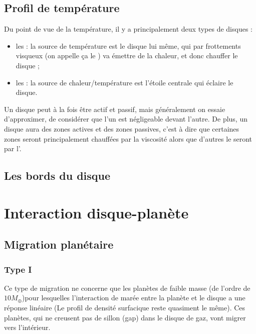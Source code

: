 \subsection{Profil de température}
Du point de vue de la température, il y a principalement deux types de disques : 
\begin{itemize}
\item les  : la source de température est le disque lui même, qui par frottements visqueux (on appelle ça le ) va émettre de la chaleur, et donc chauffer le disque ;
\item les  : la source de chaleur/température est l'étoile centrale qui éclaire le disque. 
\end{itemize}

Un disque peut à la fois être actif et passif, mais généralement on essaie d'approximer, de considérer que l'un est négligeable devant l'autre. De plus, un disque aura des zones actives et des zones passives, c'est à dire que certaines zones seront principalement chauffées par la viscosité alors que d'autres le seront par l'.

\subsection{Les bords du disque}

\section{Interaction disque-planète}
\subsection{Migration planétaire}
\subsubsection{Type I}
Ce type de migration ne concerne que les planètes de faible masse (de l'ordre de $10M_{\oplus}$)pour lesquelles l'interaction de marée entre la planète et le disque a une réponse linéaire (Le profil de densité surfacique reste quasiment le même). Ces planètes, qui ne creusent pas de sillon (gap) dans le disque de gaz, vont migrer vers l'intérieur.

